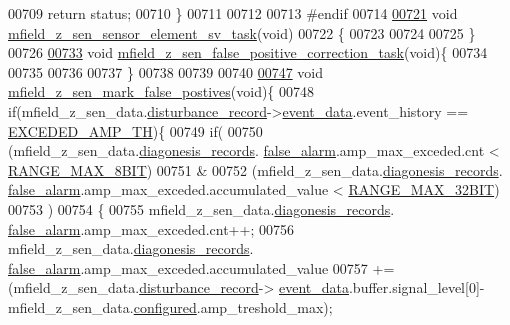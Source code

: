 \begin{DoxyCode}
00709     \textcolor{keywordflow}{return} status;
00710 \}
00711 
00712 
00713 \textcolor{preprocessor}{#endif}
00714 
\hypertarget{a00053_source_l00721}{}\hyperlink{a00053_ab3b441646e86a6cf6ddfe83c1af4e075}{00721} \textcolor{keywordtype}{void} \hyperlink{a00053_ab3b441646e86a6cf6ddfe83c1af4e075}{mfield\_z\_sen\_sensor\_element\_sv\_task}(\textcolor{keywordtype}{void})
00722 \{
00723 
00724 
00725 \}
00726 
\hypertarget{a00053_source_l00733}{}\hyperlink{a00053_a36a65e3e838c4f7be43267a10532d318}{00733} \textcolor{keywordtype}{void} \hyperlink{a00053_a36a65e3e838c4f7be43267a10532d318}{mfield\_z\_sen\_false\_positive\_correction\_task}(\textcolor{keywordtype}{void})\{
00734 
00735 
00736 
00737 \}
00738 
00739 
00740 
\hypertarget{a00053_source_l00747}{}\hyperlink{a00053_acd2adf617d062b1d3dfc9df79aa2ad32}{00747} \textcolor{keywordtype}{void} \hyperlink{a00053_acd2adf617d062b1d3dfc9df79aa2ad32}{mfield\_z\_sen\_mark\_false\_postives}(\textcolor{keywordtype}{void})\{
00748         \textcolor{keywordflow}{if}(mfield\_z\_sen\_data.\hyperlink{a00027_ac9b38e2c1d3f1013a88d33506c754152}{disturbance\_record}->\hyperlink{a00028_a8c0bda69e71ef674e60da47ad0be9ab0}{event\_data}.event\_history == 
      \hyperlink{a00019_a9c5372190518a7d696da393f1a9a5fb9}{EXCEDED\_AMP\_TH})\{
00749                \textcolor{keywordflow}{if}(
00750                 (mfield\_z\_sen\_data.\hyperlink{a00027_a2bd79ce84bbd6b7f50d38954f7ae475e}{diagonesis\_records}.
      \hyperlink{a00019_a55109284fe950025b5d9f3dde60d4553}{false\_alarm}.amp\_max\_exceded.cnt < \hyperlink{a00021_ae0c75a1cb44e5d3f00ec7c9e40acfda8}{RANGE\_MAX\_8BIT})
00751                 &
00752                 (mfield\_z\_sen\_data.\hyperlink{a00027_a2bd79ce84bbd6b7f50d38954f7ae475e}{diagonesis\_records}.
      \hyperlink{a00019_a55109284fe950025b5d9f3dde60d4553}{false\_alarm}.amp\_max\_exceded.accumulated\_value < \hyperlink{a00021_a334bd006b6d2b397dbfc620d62c3c35c}{RANGE\_MAX\_32BIT})
00753                )
00754                \{
00755                      mfield\_z\_sen\_data.\hyperlink{a00027_a2bd79ce84bbd6b7f50d38954f7ae475e}{diagonesis\_records}.
      \hyperlink{a00019_a55109284fe950025b5d9f3dde60d4553}{false\_alarm}.amp\_max\_exceded.cnt++;
00756                      mfield\_z\_sen\_data.\hyperlink{a00027_a2bd79ce84bbd6b7f50d38954f7ae475e}{diagonesis\_records}.
      \hyperlink{a00019_a55109284fe950025b5d9f3dde60d4553}{false\_alarm}.amp\_max\_exceded.accumulated\_value
00757                      +=(mfield\_z\_sen\_data.\hyperlink{a00027_ac9b38e2c1d3f1013a88d33506c754152}{disturbance\_record}->
      \hyperlink{a00028_a8c0bda69e71ef674e60da47ad0be9ab0}{event\_data}.buffer.signal\_level[0]-mfield\_z\_sen\_data.\hyperlink{a00027_a94b2d1f6ea4ab334c74d24984dd27843}{configured}.amp\_treshold\_max);

\end{DoxyCode}
